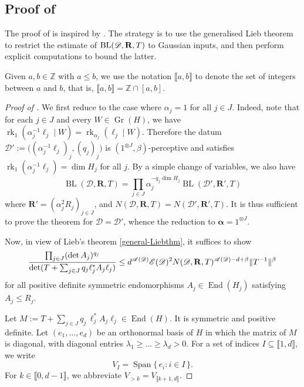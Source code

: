 \documentclass[a4paper,english]{amsart}
\theoremstyle{definition}
\newcommand{\Z}{\mathbb{Z}}
\newcommand{\bba}{\boldsymbol{\alpha}}
\newcommand{\1}{\mathbbm{1}}
\newcommand{\bbR}{{\bf{R}}}
\newcommand{\sD} {{\mathscr D}}
\newcommand{\sE}{\mathscr{E}}
\newcommand{\sA}{\mathscr{A}}
\newcommand{\bR}{\mathbf{R}}
\DeclareMathOperator{\End}{End}
\DeclareMathOperator{\Span}{Span}
\DeclareMathOperator{\rk}{rk}
\newcommand{\norm}[1]{\lVert#1\rVert}   %
\newcommand{\set}[1]{\{\, #1  \,\}}     %
\newcommand{\llrr}[1]{\llbracket#1\rrbracket}       %
\DeclareMathOperator{\Gr}{Gr}
\DeclareMathOperator{\BL}{BL}
\renewcommand{\subset}{\subseteq}
\begin{document}
\subsection{Proof of }
The  proof of  is inspired by \cite[Section 5]{BCCT08}. The strategy is to  use the generalised Lieb theorem to restrict the estimate of $\BL(\sD, \bbR, T)$ to Gaussian inputs, and then perform explicit computations to bound the latter.


Given $a, b\in \Z$ with $a\leq b$, we use the notation $\llrr{a,b}$ to denote the set of  integers between $a$ and $b$, that is, $\llrr{a,b}=\Z\cap [a,b]$.


\begin{proof}[Proof of ]

We first reduce to the case where $\alpha_j = 1$ for all $j \in J$. Indeed, note that for each $j \in J$ and every $W \in \Gr(H)$, we have
$\rk_1( \alpha_j^{-1} \ell_j \mid W) = \rk_{\alpha_j}(\ell_j \mid W)$. Therefore the datum $\sD':=\bigl((\alpha_j^{-1} \ell_j)_j, (q_j)_j\bigr)$ is $(1^{\otimes J}, \beta)$-perceptive and satisfies $\rk_1( \alpha_j^{-1} \ell_j)=\dim H_{j}$ for all $j$.  By a simple change of variables, we also have
$$\BL(\sD, \bR, T)=\prod_{j\in J} \alpha_{j}^{-q_{j}\dim H_{j}} \BL(\sD', \bR', T)$$
 where $\bR'=(\alpha_{j}^2 R_{j})_{j\in J}$, and $N(\sD, \bR, T)=N(\sD', \bR', T)$.
It  is thus sufficient to prove the theorem for $\sD=\sD'$, whence the reduction to $\bba=1^{\otimes J}$.

Now, in view of Lieb's theorem \ref{general-Liebthm}, it suffices to show
\begin{equation}
\label{eq:rlub1}
\frac{\prod_{j\in J} (\det A_{j})^{q_{j}} }{\det(T + \sum_{j \in J} q_j \ell_j^* A_{j}\ell_j)}\leq d^{\sA(\sD)}  \sE(\sD)^2 N(\sD, \bbR, T)^{\sA(\sD)-d+\beta} \norm{T^{-1}}^{\beta}
\end{equation}
for all positive definite symmetric endomorphisms $A_j \in \End(H_j)$ satisfying $A_j \leq R_j$.

Let $M := T+ \sum_{j\in J} q_{j} \,\ell^*_{j} A_{j}\ell_{j} \in \End(H)$.
It is symmetric and positive definite.
Let $(e_1, \dotsc, e_d)$ be an orthonormal basis of $H$ in which the matrix of $M$ is diagonal, with diagonal entries $\lambda_{1}\geq \dots \geq \lambda_{d}>0$.
For a set of indices $I \subset \llrr{1, d}$, we write
\[
V_I = \Span \set{ e_i : i \in I}.
\]
For $k \in \llrr{0, d-1}$, we abbreviate
\(
V_{> k} = V_{\llrr{k+1,d}}.
\)


\end{proof}
\end{document}
